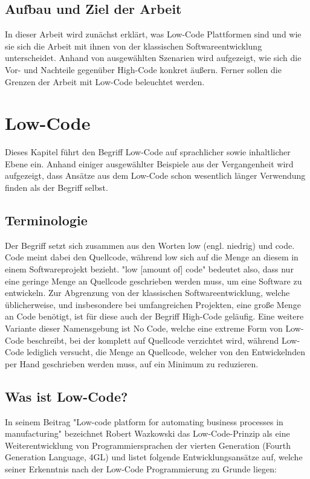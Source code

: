 \documentclass[acmtog, language=ngerman]{acmart}
\begin{document}
\subsection{Aufbau und Ziel der Arbeit}
In dieser Arbeit wird zunächst erklärt, was Low-Code Plattformen sind und wie sie sich die Arbeit mit ihnen von der klassischen Softwareentwicklung unterscheidet. Anhand von ausgewählten Szenarien wird aufgezeigt, wie sich die Vor- und Nachteile gegenüber High-Code konkret äußern. Ferner sollen die Grenzen der Arbeit mit Low-Code beleuchtet werden.


\section{Low-Code}
Dieses Kapitel führt den Begriff Low-Code auf sprachlicher sowie inhaltlicher Ebene ein. Anhand einiger ausgewählter Beispiele aus der Vergangenheit wird aufgezeigt, dass Ansätze aus dem Low-Code schon wesentlich länger Verwendung finden als der Begriff selbst.


\subsection{Terminologie}
Der Begriff setzt sich zusammen aus den Worten low (engl. niedrig) und code. Code meint dabei den Quellcode, während low sich auf die Menge an diesem in einem Softwareprojekt bezieht. "low [amount of] code" bedeutet also, dass nur eine geringe Menge an Quellcode geschrieben werden muss, um eine Software zu entwickeln. Zur Abgrenzung von der klassischen Softwareentwicklung, welche üblicherweise, und insbesondere bei umfangreichen Projekten, eine große Menge an Code benötigt, ist für diese auch der Begriff High-Code geläufig. Eine weitere Variante dieser Namensgebung ist No Code, welche eine extreme Form von Low-Code beschreibt, bei der komplett auf Quellcode verzichtet wird, während Low-Code lediglich versucht, die Menge an Quellcode, welcher von den Entwickelnden per Hand geschrieben werden muss, auf ein Minimum zu reduzieren.

\subsection{Was ist Low-Code?}
In seinem Beitrag "Low-code platform for automating business processes in manufacturing" bezeichnet Robert Wazkowski das Low-Code-Prinzip als eine Weiterentwicklung von Programmiersprachen der vierten Generation (Fourth Generation Language, 4GL) und listet folgende Entwicklungsansätze auf, welche seiner Erkenntnis nach der Low-Code Programmierung zu Grunde liegen:
\end{document}
